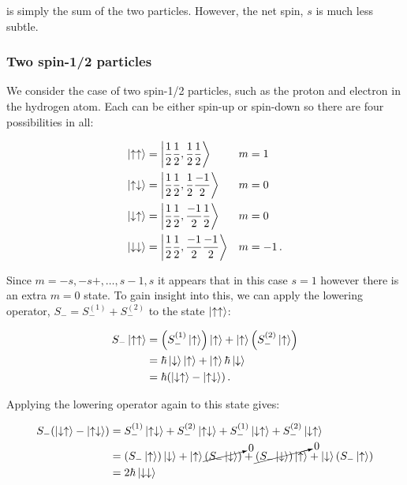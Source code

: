 \documentclass[12pt, titlepage]{article}
\begin{document}
is simply the sum of the two particles. However, the net spin, $s$ is much less subtle. 

\subsubsection{Two spin-1/2 particles}
We consider the case of two spin-1/2 particles, such as the proton and electron in the hydrogen atom. Each can be either spin-up or spin-down so there are four possibilities in all:

\begin{align*}
	\ket{\uparrow\uparrow} &= \ket{\frac{1}{2}\frac{1}{2},\frac{1}{2}\frac{1}{2}} &&m=1 \\
	\ket{\uparrow\downarrow} &= \ket{\frac{1}{2}\frac{1}{2},\frac{1}{2}\frac{-1}{2}} &&m=0 \\
	\ket{\downarrow\uparrow} &= \ket{\frac{1}{2}\frac{1}{2},\frac{-1}{2}\frac{1}{2}} &&m=0 \\
	\ket{\downarrow\downarrow} &= \ket{\frac{1}{2}\frac{1}{2},\frac{-1}{2}\frac{-1}{2}}  &&m=-1 \,.
\end{align*}

Since $m=-s,-s+,\ldots,s-1,s$ it appears that in this case $s=1$ however there is an extra $m=0$ state. To gain insight into this, we can apply the lowering operator, $S_- = S_{-}^{(1)} + S_{-}^{(2)}$ to the state $\ket{\uparrow\uparrow}$:

\begin{align*}
	S_- \ket{\uparrow\uparrow} &= \qty(S_{-}^{(1)}\ket{\uparrow})\ket{\uparrow} + \ket{\uparrow}\qty(S_{-}^{(2)}\ket{\uparrow}) \\
	&= \hbar\ket{\downarrow}\ket{\uparrow} + \ket{\uparrow}\hbar\ket{\downarrow} \\
	&= \hbar(\ket{\downarrow\uparrow} - \ket{\uparrow\downarrow}) \,.
\end{align*}

Applying the lowering operator again to this state gives:

\begin{align*}
	S_-(\ket{\downarrow\uparrow} - \ket{\uparrow\downarrow}) &= S_{-}^{(1)}\ket{\uparrow\downarrow} + S_{-}^{(2)}\ket{\uparrow\downarrow} + S_{-}^{(1)}\ket{\downarrow\uparrow} + S_{-}^{(2)}\ket{\downarrow\uparrow} \\
	&= \qty(S_{-}\ket{\uparrow})\ket{\downarrow} + \ket{\uparrow}\cancelto{0}{\qty(S_{-}\ket{\downarrow})} + \cancelto{0}{\qty(S_{-}\ket{\downarrow})\ket{\uparrow}} + \ket{\downarrow}\qty(S_{-}\ket{\uparrow}) \\
	&= 2\hbar\ket{\downarrow\downarrow}
\end{align*}
\end{document}
